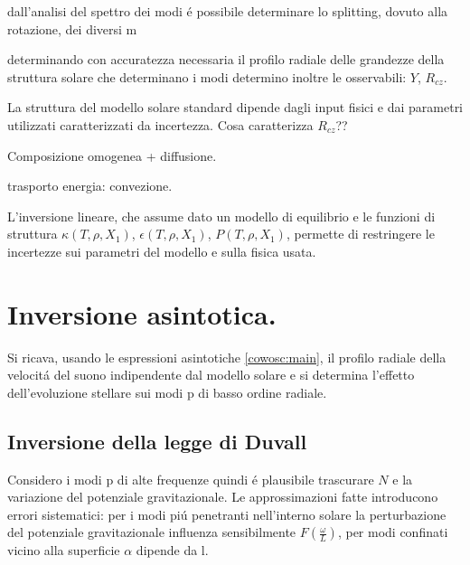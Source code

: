 \documentclass[../main.tex]{subfiles}
\begin{document}
\begin{workout}
dall'analisi del spettro dei modi \'e possibile determinare lo splitting, dovuto alla rotazione, dei diversi m
\end{workout}

\begin{workout}
determinando con accuratezza necessaria il profilo radiale delle grandezze della struttura solare che determinano i modi determino inoltre le osservabili: $Y$, $R_{cz}$.
\end{workout}

\begin{workout}
La struttura del modello solare standard dipende dagli input fisici e dai parametri utilizzati caratterizzati da incertezza.
Cosa caratterizza $R_{cz}$??

Composizione omogenea + diffusione.

trasporto energia: convezione.

\end{workout}

\begin{workout}[HSCSM]

L'inversione lineare, che assume dato un modello di equilibrio e le funzioni di struttura $\kappa(T,\rho,X_1)$, $\epsilon(T,\rho,X_1)$, $P(T,\rho,X_1)$, permette di restringere le incertezze sui parametri del modello e sulla fisica usata.

\end{workout}

{\let\clearpage\relax\let\cleardoublepage\relax \chapter{Inversione asintotica.}} %

Si ricava, usando le espressioni asintotiche \eqref{cowosc:main}, il profilo radiale della velocit\'a del suono indipendente dal modello solare e si determina l'effetto dell'evoluzione stellare sui modi p di basso ordine radiale.

\section{Inversione della legge di Duvall}

Considero i modi p di alte frequenze quindi \'e plausibile trascurare $N$ e la variazione del potenziale gravitazionale. Le approssimazioni fatte introducono errori sistematici: per i modi pi\'u penetranti nell'interno solare la perturbazione del potenziale gravitazionale influenza sensibilmente $F(\frac{\omega}{L})$, per modi confinati vicino alla superficie $\alpha$ dipende da l.
\end{document}

